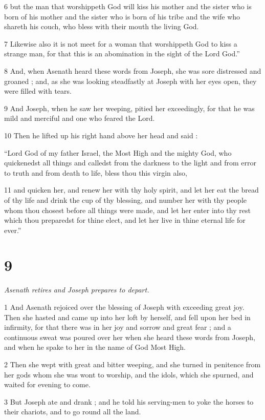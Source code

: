 6 but the man that worshippeth God will kiss his mother and the sister who is born of his mother and the sister who is born of his tribe and the wife who shareth his couch, who bless with their mouth the living God. 

7 Likewise also it is not meet for a woman that worshippeth God to kiss a strange man, for that this is an abomination in the sight of the Lord God.” 

8 And, when Asenath heard these words from Joseph, she was sore distressed and groaned ; and, as she was looking steadfastly at Joseph with her eyes open, they were filled with tears. 

9 And Joseph, when he saw her weeping, pitied her exceedingly, for that he was mild and merciful and one who feared the Lord. 

10 Then he lifted up his right hand above her head and said : 

“Lord God of my father Israel, the Most High and the mighty God, 
who quickenedst all things and calledst from the darkness to the light 
and from error to truth and from death to life, 
bless thou this virgin also, 

11 and quicken her, and renew her with thy holy spirit, 
and let her eat the bread of thy life and drink the cup of thy blessing, 
and number her with thy people whom thou chosest before all things were made, 
and let her enter into thy rest which thou preparedst for thine elect, 
and let her live in thine eternal life for ever.”

\chapter{9}

\par \textit{Asenath retires and Joseph prepares to depart.}

1 And Asenath rejoiced over the blessing of Joseph with exceeding great joy. Then she hasted and came up into her loft by herself, and fell upon her bed in infirmity, for that there was in her joy and sorrow and great fear ; and a continuous sweat was poured over her when she heard these words from Joseph, and when he spake to her in the name of God Most High. 

2 Then she wept with great and bitter weeping, and she turned in penitence from her gods whom she was wont to worship, and the idols, which she spurned, and waited for evening to come. 

3 But Joseph ate and drank ; and he told his serving-men to yoke the horses to their chariots, and to go round all the land. 

